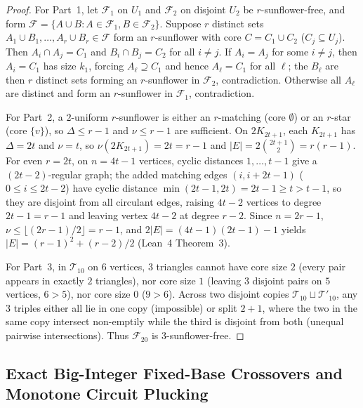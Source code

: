 \documentclass[11pt,a4paper]{article}
\theoremstyle{definition}
\theoremstyle{remark}
\begin{document}
\begin{proof}
For Part~1, let $\mathcal{F}_1$ on $U_1$ and $\mathcal{F}_2$ on disjoint $U_2$ be $r$-sunflower-free, and form $\mathcal{F} = \{A \cup B : A \in \mathcal{F}_1, B \in \mathcal{F}_2\}$. Suppose $r$ distinct sets $A_1 \cup B_1, \dots, A_r \cup B_r \in \mathcal{F}$ form an $r$-sunflower with core $C = C_1 \cup C_2$ ($C_j \subseteq U_j$). Then $A_i \cap A_j = C_1$ and $B_i \cap B_j = C_2$ for all $i \neq j$. If $A_i = A_j$ for some $i \neq j$, then $A_i = C_1$ has size $k_1$, forcing $A_\ell \supseteq C_1$ and hence $A_\ell = C_1$ for all $\ell$; the $B_\ell$ are then $r$ distinct sets forming an $r$-sunflower in $\mathcal{F}_2$, contradiction. Otherwise all $A_\ell$ are distinct and form an $r$-sunflower in $\mathcal{F}_1$, contradiction.

For Part~2, a $2$-uniform $r$-sunflower is either an $r$-matching (core $\emptyset$) or an $r$-star (core $\{v\}$), so $\Delta \le r-1$ and $\nu \le r-1$ are sufficient. On $2K_{2t+1}$, each $K_{2t+1}$ has $\Delta = 2t$ and $\nu = t$, so $\nu(2K_{2t+1}) = 2t = r-1$ and $|E| = 2\binom{2t+1}{2} = r(r-1)$. For even $r = 2t$, on $n = 4t-1$ vertices, cyclic distances $1,\dots,t-1$ give a $(2t-2)$-regular graph; the added matching edges $(i, i+2t-1)$ ($0 \le i \le 2t-2$) have cyclic distance $\min(2t-1, 2t) = 2t-1 \ge t > t-1$, so they are disjoint from all circulant edges, raising $4t-2$ vertices to degree $2t-1 = r-1$ and leaving vertex $4t-2$ at degree $r-2$. Since $n = 2r-1$, $\nu \le \lfloor (2r-1)/2 \rfloor = r-1$, and $2|E| = (4t-1)(2t-1)-1$ yields $|E| = (r-1)^2 + (r-2)/2$ (Lean~4 Theorem~3).

For Part~3, in $\mathcal{T}_{10}$ on $6$ vertices, $3$ triangles cannot have core size $2$ (every pair appears in exactly $2$ triangles), nor core size $1$ (leaving $3$ disjoint pairs on $5$ vertices, $6 > 5$), nor core size $0$ ($9 > 6$). Across two disjoint copies $\mathcal{T}_{10} \sqcup \mathcal{T}'_{10}$, any $3$ triples either all lie in one copy (impossible) or split $2+1$, where the two in the same copy intersect non-emptily while the third is disjoint from both (unequal pairwise intersections). Thus $\mathcal{F}_{20}$ is $3$-sunflower-free.
\end{proof}

\subsection{Exact Big-Integer Fixed-Base Crossovers and Monotone Circuit Plucking}
\end{document}
